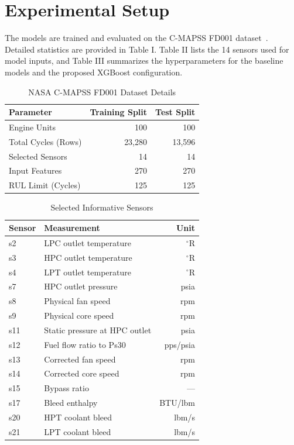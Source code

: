 \documentclass[letterpaper, 10 pt, conference]{ieeeconf}
\begin{document}
\section{Experimental Setup}
\label{sec:setup}
The models are trained and evaluated on the C-MAPSS FD001 dataset~\cite{cmapss}. Detailed statistics are provided in Table I. Table II lists the 14 sensors used for model inputs, and Table III summarizes the hyperparameters for the baseline models and the proposed XGBoost configuration.

\begin{table}[htbp]
\caption{NASA C-MAPSS FD001 Dataset Details}
\label{tab:dataset}
\centering\small
\begin{tabular}{lrr}
\toprule
\textbf{Parameter} & \textbf{Training Split} & \textbf{Test Split} \\
\midrule
Engine Units & 100 & 100 \\
Total Cycles (Rows) & 23,280 & 13,596 \\
Selected Sensors & 14 & 14 \\
Input Features & 270 & 270 \\
RUL Limit (Cycles) & 125 & 125 \\
\bottomrule
\end{tabular}
\end{table}

\begin{table}[htbp]
\caption{Selected Informative Sensors}
\label{tab:sensors}
\centering\small
\begin{tabular}{llr}
\toprule
\textbf{Sensor} & \textbf{Measurement} & \textbf{Unit} \\
\midrule
s2 & LPC outlet temperature & ${}^\circ$R \\
s3 & HPC outlet temperature & ${}^\circ$R \\
s4 & LPT outlet temperature & ${}^\circ$R \\
s7 & HPC outlet pressure & psia \\
s8 & Physical fan speed & rpm \\
s9 & Physical core speed & rpm \\
s11 & Static pressure at HPC outlet & psia \\
s12 & Fuel flow ratio to Ps30 & pps/psia \\
s13 & Corrected fan speed & rpm \\
s14 & Corrected core speed & rpm \\
s15 & Bypass ratio & --- \\
s17 & Bleed enthalpy & BTU/lbm \\
s20 & HPT coolant bleed & lbm/s \\
s21 & LPT coolant bleed & lbm/s \\
\bottomrule
\end{tabular}
\end{table}
\end{document}
